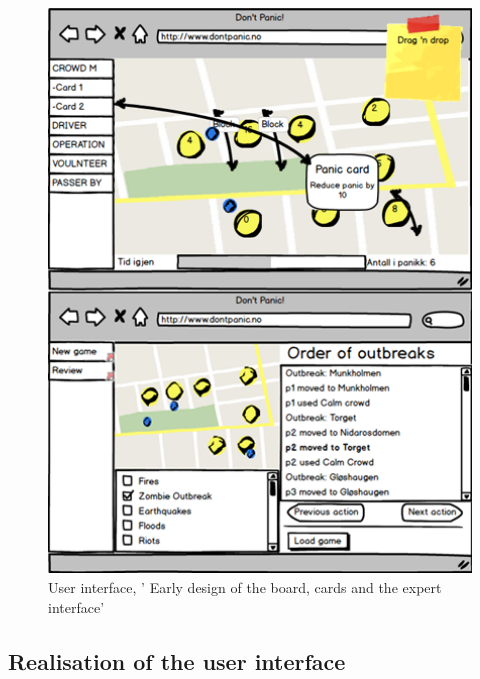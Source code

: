 \begin{figure}[H]
  \centering
    \includegraphics[width=1.0\textwidth]{img/mockups.png}
  \caption{User interface, ' Early design of the board, cards and the expert interface'} 
  \label{fig:mockups}
\end{figure}




\subsection{Realisation of the user interface}

